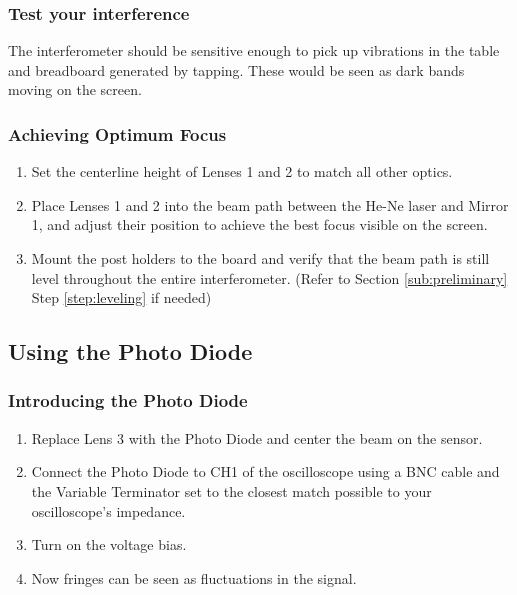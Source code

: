     \subsubsection{Test your interference}

        The interferometer should be sensitive enough to pick up vibrations in
        the table and breadboard generated by tapping. These would be seen as
        dark bands moving on the screen.
    \subsubsection{Achieving Optimum Focus}
        \begin{enumerate}
        \item Set the centerline height of Lenses 1 and 2 to match all other
        optics.
        \item Place Lenses 1 and 2 into the beam path between the He-Ne laser
        and Mirror 1, and adjust their position to achieve the best focus
        visible on the screen.
        \item Mount the post holders to the board and verify that the beam path
        is still level throughout the entire interferometer. (Refer to Section
        \ref{sub:preliminary} Step \ref{step:leveling} if needed)
        \end{enumerate}


\subsection{Using the Photo Diode}
\label{sec:photodiode}

    \subsubsection{Introducing the Photo Diode}
        \begin{enumerate}
        \item Replace Lens 3 with the Photo Diode and center the beam on the
        sensor.
        \item Connect the Photo Diode to CH1 of the oscilloscope using a BNC
        cable and the Variable Terminator set to the closest match possible to
        your oscilloscope's impedance.
        \item Turn on the voltage bias.
        \item Now fringes can be seen as fluctuations in the signal.
        \end{enumerate}

